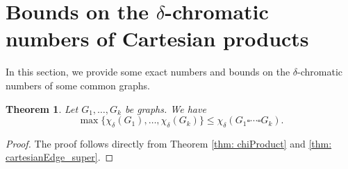 \documentclass[12pt]{amsart}
\newtheorem{theorem}{Theorem}
\begin{document}
\section{Bounds on the $\delta$-chromatic numbers of Cartesian products}

In this section, we provide some exact numbers and bounds on the $\delta$-chromatic numbers of some common graphs.

\begin{theorem}
Let $G_1,\dots,G_k$ be graphs. We have
    $$\max\{\chi_{\delta}(G_1),\dots,\chi_{\delta}(G_k)\}\leq \chi_{\delta}(G_1\square\cdots\square G_k).$$
\end{theorem}
\begin{proof}
   The proof follows directly from Theorem \ref{thm: chiProduct} and \ref{thm: cartesianEdge_super}.
\end{proof}
\end{document}
